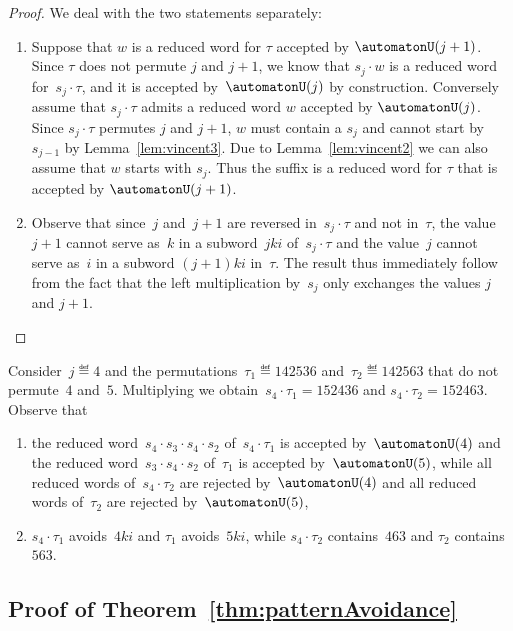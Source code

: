 \begin{proof}
We deal with the two statements separately:
\begin{enumerate} 
	\item Suppose that $w$ is a reduced word for $\tau$ accepted by $\automatonU(j+1)$. Since $\tau$ does not permute $j$ and $j+1$, we know that $s_j \cdot w$ is a reduced word for~$s_j \cdot \tau$, and it is accepted by~$\automatonU(j)$ by construction. Conversely assume that $s_j \cdot \tau$ admits a reduced word $w$ accepted by $\automatonU(j)$. Since $s_j \cdot \tau$ permutes $j$ and $j+1$, $w$ must contain a $s_j$ and cannot start by $s_{j-1}$ by Lemma~\ref{lem:vincent3}. Due to Lemma~\ref{lem:vincent2} we can also assume that $w$ starts with $s_j$. Thus the suffix is a reduced word for $\tau$ that is accepted by $\automatonU(j+1)$.
	\item Observe that since~$j$ and~$j+1$ are reversed in~$s_j \cdot \tau$ and not in~$\tau$, the value $j+1$ cannot serve as~$k$ in a subword~$jki$ of~$s_j \cdot \tau$ and the value~$j$ cannot serve as~$i$ in a subword $(j+1)ki$ in~$\tau$. The result thus immediately follow from the fact that the left multiplication by~$s_j$ only exchanges the values $j$ and $j+1$.
	\qedhere
\end{enumerate}
\end{proof}

\begin{example}\label{exm:lemVincent4}
Consider~$j \eqdef 4$ and the permutations~$\tau_1 \eqdef 142536$ and~$\tau_2 \eqdef 142563$ that do not permute~$4$ and~$5$. 
Multiplying we obtain~$s_4 \cdot \tau_1 = 152436$ and ${s_4 \cdot \tau_2 = 152463}$. Observe that
\begin{enumerate}
	\item the reduced word~$s_4 \cdot s_3 \cdot s_4 \cdot s_2$ of~$s_4 \cdot \tau_1$ is accepted by~$\automatonU(4)$ and the reduced word~$s_3 \cdot s_4 \cdot s_2$ of~$\tau_1$ is accepted by~$\automatonU(5)$, while all reduced words of~$s_4 \cdot \tau_2$ are rejected by~$\automatonU(4)$ and all reduced words of~$\tau_2$ are rejected by~$\automatonU(5)$,
	\item $s_4 \cdot \tau_1$ avoids~$4ki$ and $\tau_1$ avoids~$5ki$, while $s_4 \cdot \tau_2$ contains~$463$ and $\tau_2$ contains~$563$.
\end{enumerate}
\end{example}

\subsection{Proof of Theorem~\ref{thm:patternAvoidance}}

